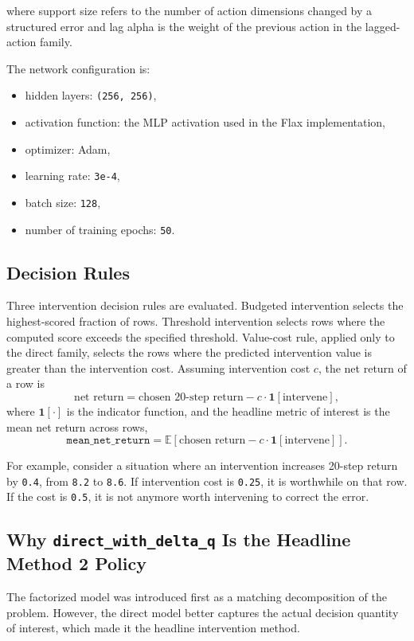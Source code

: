 \documentclass[11pt]{article}
\begin{document}
where support size refers to the number of action dimensions changed by a structured error and lag alpha is the weight of the previous action in the lagged-action family.

The network configuration is:

\begin{itemize}
\item hidden layers: \texttt{(256, 256)},
\item activation function: the MLP activation used in the Flax implementation,
\item optimizer: Adam,
\item learning rate: \texttt{3e-4},
\item batch size: \texttt{128},
\item number of training epochs: \texttt{50}.
\end{itemize}

\subsection*{Decision Rules}

Three intervention decision rules are evaluated. Budgeted intervention selects the highest-scored fraction of rows. Threshold intervention selects rows where the computed score exceeds the specified threshold. Value-cost rule, applied only to the direct family, selects the rows where the predicted intervention value is greater than the intervention cost. Assuming intervention cost \(c\), the net return of a row is
\[
\text{net return} = \text{chosen 20-step return} - c \cdot \mathbf{1}[\text{intervene}],
\]
where \(\mathbf{1}[\cdot]\) is the indicator function, and the headline metric of interest is the mean net return across rows,
\[
\texttt{mean\_net\_return} = \mathbb{E}\!\left[\text{chosen return} - c \cdot \mathbf{1}[\text{intervene}]\right].
\]

For example, consider a situation where an intervention increases 20-step return by \texttt{0.4}, from \texttt{8.2} to \texttt{8.6}. If intervention cost is \texttt{0.25}, it is worthwhile on that row. If the cost is \texttt{0.5}, it is not anymore worth intervening to correct the error.

\subsection*{Why \texttt{direct\_with\_delta\_q} Is the Headline Method 2 Policy}

The factorized model was introduced first as a matching decomposition of the problem. However, the direct model better captures the actual decision quantity of interest, which made it the headline intervention method.
\end{document}
